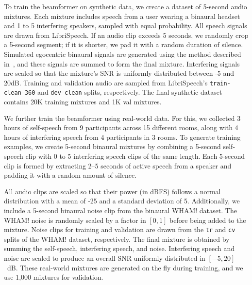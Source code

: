 To train the beamformer on synthetic data, we create a dataset of 5-second audio mixtures. Each mixture includes speech from a user wearing a binaural headset and 1 to 5 interfering speakers, sampled with equal probability. All speech signals are drawn from LibriSpeech. If an audio clip exceeds 5 seconds, we randomly crop a 5-second segment; if it is shorter, we pad it with a random duration of silence. Simulated egocentric binaural signals are generated using the method described in~, and these signals are summed to form the final mixture. Interfering signals are scaled so that the mixture’s SNR is uniformly distributed between -5 and 20dB. Training and validation audio are sampled from LibriSpeech’s \verb+train-clean-360+ and \verb+dev-clean+ splits, respectively. The final synthetic dataset contains 20K training mixtures and 1K val mixtures.



We further train the beamformer using real-world data. For this, we collected 3 hours of self-speech from 9 participants across 15 different rooms, along with 4 hours of interfering speech from 4 participants in 3 rooms. To generate training examples, we create 5-second binaural mixtures by combining a 5-second self-speech clip with 0 to 5 interfering speech clips of the same length. Each 5-second clip is formed by extracting 2–5 seconds of active speech from a speaker and padding it with a random amount of silence.

All audio clips are scaled so that their power (in dBFS) follows a normal distribution with a mean of -25 and a standard deviation of 5. Additionally, we include a 5-second binaural noise clip from the binaural WHAM! dataset. The WHAM! noise is randomly scaled by a factor in $[0,1]$ before being added to the mixture. Noise clips for training and validation are drawn from the \verb+tr+ and \verb+cv+ splits of the WHAM! dataset, respectively. The final mixture is obtained by summing the self-speech, interfering speech, and noise. Interfering speech and noise are scaled to produce an overall SNR uniformly distributed in $[-5,20]$~dB. These real-world mixtures are generated on the fly during training, and we use 1,000 mixtures for validation.

